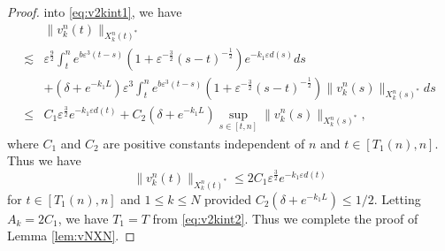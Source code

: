 \documentclass[11pt]{amsart}
\theoremstyle{remark}
\numberwithin{equation}{section}
\begin{document}
\begin{proof}
into \eqref{eq:v2kint1}, we have
\begin{equation}
  \label{eq:<n}
  \begin{split}
&  \|v_k^n(t)\|_{X_k^n(t)^*} \\ \lesssim &
{\varepsilon}^{\frac92}\int_t^n e^{b{\varepsilon}^3(t-s)}
(1+{\varepsilon}^{-\frac32}(s-t)^{-\frac12})e^{-k_1{\varepsilon} d(s)}ds
\\ & + (\delta+e^{-k_1L}){\varepsilon}^3\int_t^ne^{b{\varepsilon}^3(t-s)}
(1+{\varepsilon}^{-\frac32}(s-t)^{-\frac12})\|v_k^n(s)\|_{X_k^n(s)^*}ds
\\ \le &
C_1{\varepsilon}^{\frac32}e^{-k_1{\varepsilon} d(t)}+C_2(\delta+e^{-k_1L})
\sup_{s\in[t,n]}\|v_k^n(s)\|_{X_k^n(s)^*},
  \end{split}
\end{equation}
where $C_1$ and  $C_2$ are positive constants independent of $n$ and $t
\in[T_1(n),n]$. Thus we have
\begin{equation}
  \label{eq:v2kint2}
\|v_k^n(t)\|_{X_k^n(t)^*} \le 2C_1{\varepsilon}^{\frac32}e^{-k_1{\varepsilon} d(t)}
\end{equation}
for $t\in [T_1(n),n]$ and $1\le k\le N$ provided $C_2(\delta+e^{-k_1L})\le 1/2$.
Letting  $A_k=2C_1$, we have $T_1=T$  from  \eqref{eq:v2kint2}.
Thus we complete the proof of Lemma \ref{lem:vNXN}.
\end{proof}
\end{document}
